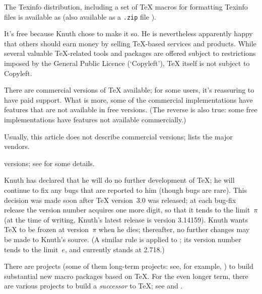 The Texinfo distribution, including a set of \TeX{} macros for
formatting Texinfo files is available as  (also
available as a \texttt{.zip} file ).


It's free because Knuth chose to make it so.  He is nevertheless
apparently happy
that others should earn money by selling \TeX{}-based services and
products. While several valuable \TeX{}-related tools and packages are
offered subject to restrictions imposed by the  General Public
Licence (`Copyleft'), \TeX{} itself is not subject to Copyleft.

There are commercial versions of \TeX{} available; for some users,
it's reassuring to have paid support.  What is more, some of the
commercial implementations
have features that are not available in free versions.  (The
reverse is also true: some free implementations have features
not available commercially.)

Usually, this article does not describe commercial
\htmlignore
versions;   lists the major vendors.
\endhtmlignore
\begin{htmlversion}
versions; see  for some details.
\end{htmlversion}


Knuth has declared that he will do no further development of \TeX{};
he will continue to fix any bugs that are reported to him (though
bugs are rare).  This decision was made soon after
\TeX{} version~3.0 was released; at each bug-fix release
the version number acquires one more digit, so that it tends to the
limit~$\pi$ (at the time of writing, Knuth's latest release is version
3.14159).  Knuth wants \TeX{} to be frozen at version~$\pi$ when he
dies; thereafter, no further changes may be made to Knuth's source.
(A similar rule is applied to \MF{}; its version number tends to the
limit~$e$, and currently stands at 2.718.)

There are projects (some of them long-term
projects: see, for example,
)
to build substantial
new macro packages based on \TeX{}.  For the even longer term, there
are various projects to build a \emph{successor} to \TeX{}; see
 and .

